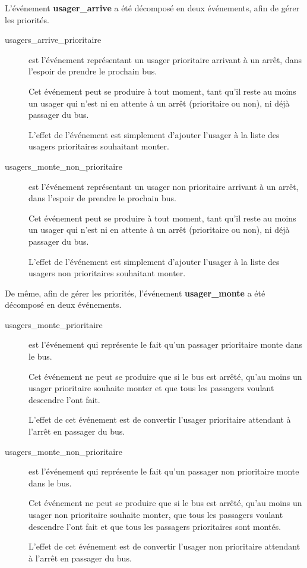\documentclass[a4paper,titlepage]{report}
\begin{document}
		L'événement \textbf{usager\_arrive} a été décomposé en deux événements, afin de gérer les priorités.
		\begin{description}
			\item[usagers\_arrive\_prioritaire] est l'événement représentant un usager prioritaire arrivant à un arrêt, dans l'espoir de prendre le prochain bus.
			
			Cet événement peut se produire à tout moment, tant qu'il reste au moins un usager qui n'est ni en attente à un arrêt (prioritaire ou non), ni déjà passager du bus.
			
			L'effet de l'événement est simplement d'ajouter l'usager à la liste des usagers prioritaires souhaitant monter.\\
			
			\item[usagers\_monte\_non\_prioritaire] est l'événement représentant un usager non prioritaire arrivant à un arrêt, dans l'espoir de prendre le prochain bus.
			
			Cet événement peut se produire à tout moment, tant qu'il reste au moins un usager qui n'est ni en attente à un arrêt (prioritaire ou non), ni déjà passager du bus.
			
			L'effet de l'événement est simplement d'ajouter l'usager à la liste des usagers non prioritaires souhaitant monter.\\
		\end{description}
		
		De même, afin de gérer les priorités, l'événement \textbf{usager\_monte} a été décomposé en deux événements.
		\begin{description}
			\item[usagers\_monte\_prioritaire] est l'événement qui représente le fait qu'un passager prioritaire monte dans le bus.
			
			Cet événement ne peut se produire que si le bus est arrêté, qu'au moins un usager prioritaire souhaite monter et que tous les passagers voulant descendre l'ont fait.
			
			L'effet de cet événement est de convertir l'usager prioritaire attendant à l'arrêt en passager du bus.\\
			
			\item[usagers\_monte\_non\_prioritaire] est l'événement qui représente le fait qu'un passager non prioritaire monte dans le bus.
			
			Cet événement ne peut se produire que si le bus est arrêté, qu'au moins un usager non prioritaire souhaite monter, que tous les passagers voulant descendre l'ont fait et que tous les passagers prioritaires sont montés.
			
			L'effet de cet événement est de convertir l'usager non prioritaire attendant à l'arrêt en passager du bus.\\
		\end{description}
			
\end{document}

